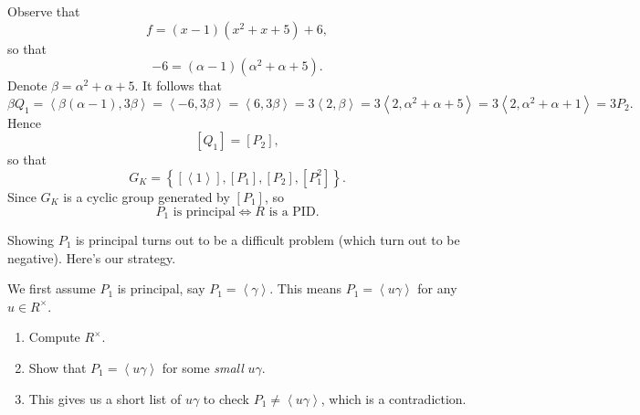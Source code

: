 \documentclass[pmath441]{subfiles}
\begin{document}
\begin{answer}
        Observe that
        \begin{equation*}
            f = \left( x-1 \right)\left( x^{2}+x+5 \right) + 6,
        \end{equation*}
        so that
        \begin{equation*}
            -6 = \left( \alpha-1 \right)\left( \alpha^{2}+\alpha+5 \right).
        \end{equation*}
        Denote $\beta = \alpha^{2}+\alpha+5$. It follows that
        \begin{equation*}
            \beta Q_1 = \left< \beta\left( \alpha-1 \right), 3\beta \right> = \left< -6,3\beta \right> = \left< 6,3\beta \right> = 3\left< 2,\beta \right> = 3\left< 2,\alpha^{2}+\alpha+5 \right> = 3\left< 2,\alpha^{2}+\alpha+1 \right> = 3P_2.      
        \end{equation*}
        Hence
        \begin{equation*}
            \left[ Q_1 \right] = \left[ P_2 \right],
        \end{equation*}
        so that
        \begin{equation*}
            G_K = \left\lbrace \left[ \left< 1 \right>  \right], \left[ P_1 \right], \left[ P_2 \right],\left[ P_1^{2} \right] \right\rbrace.
        \end{equation*}
        Since $G_K$ is a cyclic group generated by $\left[ P_1 \right]$, so
        \begin{equation*}
            P_1 \text{ is principal} \iff R\text{ is a PID}.
        \end{equation*}

        Showing $P_1$ is principal turns out to be a difficult problem (which turn out to be negative). Here's our strategy.

        We first assume $P_1$ is principal, say $P_1 = \left< \gamma \right>$. This means $P_1 = \left< u\gamma \right>$ for any $u\in R^{\times}$.
        \begin{enumerate}
            \item Compute $R^{\times}$.
            \item Show that $P_1 = \left< u\gamma \right>$ for some \textit{small} $u\gamma$.
            \item This gives us a short list of $u\gamma$ to check $P_1\neq\left< u\gamma \right>$, which is a contradiction. 
        \end{enumerate}
        \qedplacedtrue
    \end{answer}
    
    
    
    
    
    
    
    
    
    
    
    
    
    
    
    
    
    
    
    
    
    
    
    
    
    
    
    
    
    
    
    
    
    
\end{document}
